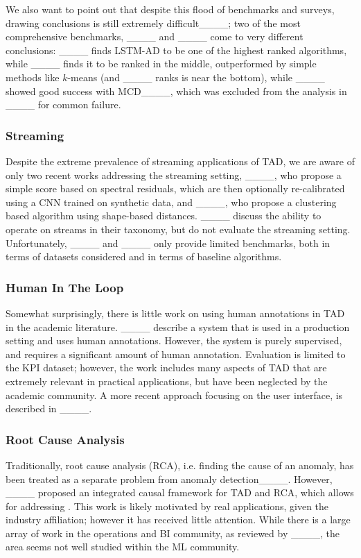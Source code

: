 We also want to point out that despite this flood of benchmarks and surveys, drawing conclusions is still extremely difficult____; two of the most comprehensive benchmarks, ____ and ____ come to very different conclusions: ____ finds LSTM-AD to be one of the highest ranked algorithms, while ____ finds it to be ranked in the middle, outperformed by simple methods like $k$-means (and ____ ranks is near the bottom), while ____ showed good success with MCD____, which was excluded from the analysis in ____ for common failure.


\subsubsection{Streaming}\label{sec:related_streaming}
Despite the extreme prevalence of streaming applications of TAD, we are aware of only two recent works addressing the streaming setting, ____, who propose a simple score based on spectral residuals, which are then optionally re-calibrated using a CNN trained on synthetic data, and ____, who propose a clustering based algorithm using shape-based distances. ____ discuss the ability to operate on streams in their taxonomy, but do not evaluate the streaming setting. Unfortunately, ____ and ____ only provide limited benchmarks, both in terms of datasets considered and in terms of baseline algorithms.

\subsubsection{Human In The Loop}
Somewhat surprisingly, there is little work on using human annotations in TAD in the academic literature. ____ describe a system that is used in a production setting and uses human annotations. However, the system is purely supervised, and requires a significant amount of human annotation. Evaluation is limited to the KPI dataset; however, the work includes many aspects of TAD that are extremely relevant in practical applications, but have been neglected by the academic community. A more recent approach focusing on the user interface, is described in ____.

\subsubsection{Root Cause Analysis}
Traditionally, root cause analysis (RCA), i.e. finding the cause of an anomaly, has been treated as a separate problem from anomaly detection____. However, ____ proposed an integrated causal framework for TAD and RCA, which allows for addressing \conditionalanomalies. This work is likely motivated by real applications, given the industry affiliation; however it has received little attention. While there is a large array of work in the operations and BI community, as reviewed by ____, the area seems not well studied within the ML community.


